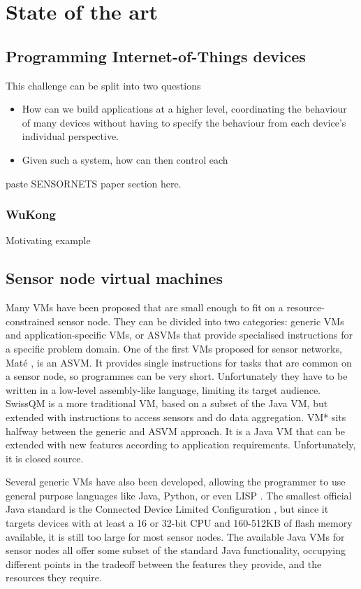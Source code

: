 \chapter{State of the art}

\section{Programming Internet-of-Things devices}

This challenge can be split into two questions

\begin{itemize}
	\item How can we build applications at a higher level, coordinating the behaviour of many devices without having to specify the behaviour from each device's individual perspective.
	\item Given such a system, how can then control each 
\end{itemize}

paste SENSORNETS paper section here.

\subsection{WuKong}
Motivating example

\section{Sensor node virtual machines}
Many VMs have been proposed that are small enough to fit on a resource-constrained sensor node. They can be divided into two categories: generic VMs and application-specific VMs, or ASVMs \cite{Culler05} that provide specialised instructions for a specific problem domain. One of the first VMs proposed for sensor networks, Mat\'e \cite{Levis:2002ku}, is an ASVM. It provides single instructions for tasks that are common on a sensor node, so programmes can be very short. Unfortunately they have to be written in a low-level assembly-like language, limiting its target audience. SwissQM \cite{Muller:2007fs} is a more traditional VM, based on a subset of the Java VM, but extended with instructions to access sensors and do data aggregation. VM* \cite{Koshy:2005ww} sits halfway between the generic and ASVM approach. It is a Java VM that can be extended with new features according to application requirements. Unfortunately, it is closed source.

Several generic VMs have also been developed, allowing the programmer to use general purpose languages like Java, Python, or even LISP \cite{Harbaum, Brouwers:2009cj, Aslam:2008, Evers:2010ur}. The smallest official Java standard is the Connected Device Limited Configuration \cite{CLDC}, but since it targets devices with at least a 16 or 32-bit CPU and 160-512KB of flash memory available, it is still too large for most sensor nodes. The available Java VMs for sensor nodes all offer some subset of the standard Java functionality, occupying different points in the tradeoff between the features they provide, and the resources they require.



